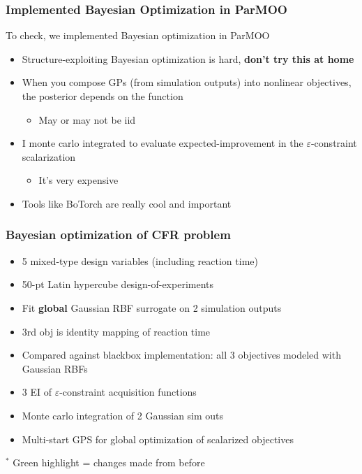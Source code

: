 \documentclass[aspectratio=169]{beamer}
\begin{document}
\begin{frame}\frametitle{Implemented Bayesian Optimization in ParMOO}

To check, we implemented Bayesian optimization in ParMOO

\bigskip

\begin{itemize}
\pause\item Structure-exploiting Bayesian optimization is hard, {\bf don't try this at home}
\pause\item When you compose GPs (from simulation outputs) into nonlinear objectives, the posterior depends on the function
\begin{itemize}
\item May or may not be iid
\end{itemize}
\pause \item I monte carlo integrated to evaluate expected-improvement in the $\varepsilon$-constraint scalarization
\begin{itemize}
\item It's very expensive
\end{itemize}
\pause\item Tools like BoTorch are really cool and important
\end{itemize}
\end{frame}

\begin{frame}\frametitle{Bayesian optimization of CFR problem}
\begin{itemize}
\item 5 mixed-type design variables (including reaction time)
\item 50-pt Latin hypercube design-of-experiments
\item Fit {\bf global} Gaussian RBF surrogate on 2 simulation outputs
\item {\color{blue}3rd obj is identity mapping of reaction time}
\item {\color{red}Compared against blackbox implementation: all 3 objectives
modeled with Gaussian RBFs}
\item {\color{green}3 EI of $\varepsilon$-constraint acquisition functions}
\item {\color{green}Monte carlo integration of 2 Gaussian sim outs}
\item {\color{green}Multi-start GPS for global optimization of scalarized objectives}
\end{itemize}

\bigskip

$^*${\color{green} Green highlight} = changes made from before
\end{frame}
\end{document}

